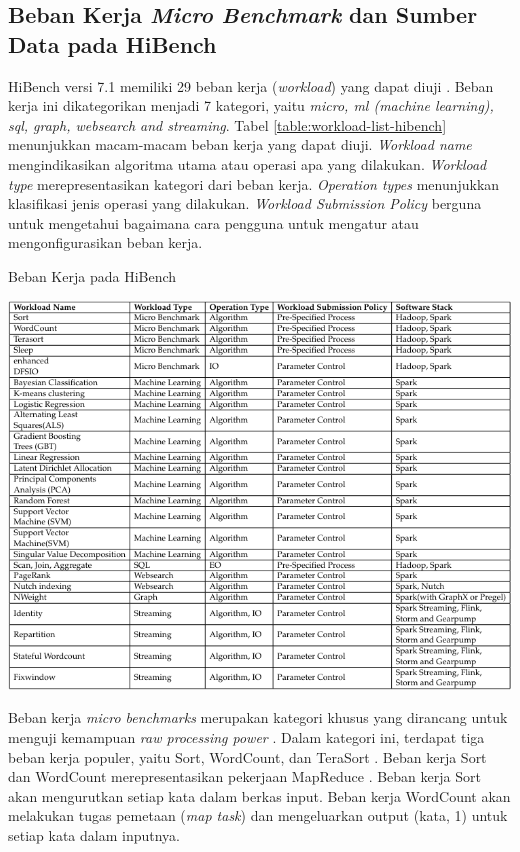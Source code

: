 \subsection{Beban Kerja \textit{Micro Benchmark} dan Sumber Data pada HiBench}
HiBench versi 7.1 memiliki 29 beban kerja (\textit{workload}) yang dapat diuji \cite{IntelbigdataHiBench2023}. Beban kerja ini dikategorikan menjadi 7 kategori, yaitu \textit{micro, ml (machine learning), sql, graph, websearch and streaming}. Tabel \ref{table:workload-list-hibench} menunjukkan macam-macam beban kerja yang dapat diuji. \textit{Workload name} mengindikasikan algoritma utama atau operasi apa yang dilakukan. \textit{Workload type} merepresentasikan kategori dari beban kerja. \textit{Operation types} menunjukkan klasifikasi jenis operasi yang dilakukan. \textit{Workload Submission Policy} berguna untuk mengetahui bagaimana cara pengguna untuk mengatur atau mengonfigurasikan beban kerja.

\begin{table}[h]
  \centering
  \caption{Beban Kerja pada HiBench \cite{barosenAnalysisComparisonInterfacing2018}}
  \includegraphics[width=1\textwidth]{figures/ch02/workload-hibench}
  \label{table:workload-list-hibench}
\end{table}

Beban kerja \textit{micro benchmarks} merupakan kategori khusus yang dirancang untuk menguji kemampuan \textit{raw processing power} \cite{barosenAnalysisComparisonInterfacing2018}. Dalam kategori ini, terdapat tiga beban kerja populer, yaitu Sort, WordCount, dan TeraSort \cite{huangHiBenchBenchmarkSuitea}. Beban kerja Sort dan WordCount merepresentasikan pekerjaan MapReduce \cite{deanMapReduceSimplifiedData2004}. Beban kerja Sort akan mengurutkan setiap kata dalam berkas input. Beban kerja WordCount akan melakukan tugas pemetaan (\textit{map task}) dan mengeluarkan output (kata, 1) untuk setiap kata dalam inputnya.  

